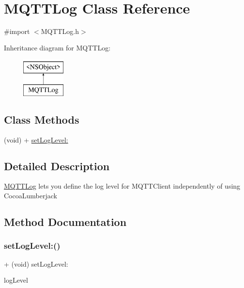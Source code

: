 \hypertarget{interface_m_q_t_t_log}{}\section{M\+Q\+T\+T\+Log Class Reference}
\label{interface_m_q_t_t_log}


{\ttfamily \#import $<$M\+Q\+T\+T\+Log.\+h$>$}

Inheritance diagram for M\+Q\+T\+T\+Log\+:\begin{figure}[H]
\begin{center}
\leavevmode
\includegraphics[height=2.000000cm]{interface_m_q_t_t_log}
\end{center}
\end{figure}
\subsection*{Class Methods}
\begin{DoxyCompactItemize}
\item 
(void) + \hyperlink{interface_m_q_t_t_log_a27f49af5a0c2f9b5d975bf3e9fef2c6c}{set\+Log\+Level\+:}
\end{DoxyCompactItemize}


\subsection{Detailed Description}
\hyperlink{interface_m_q_t_t_log}{M\+Q\+T\+T\+Log} lets you define the log level for M\+Q\+T\+T\+Client independently of using Cocoa\+Lumberjack 

\subsection{Method Documentation}
\mbox{\label{interface_m_q_t_t_log_a27f49af5a0c2f9b5d975bf3e9fef2c6c}} 
\subsubsection{\texorpdfstring{set\+Log\+Level\+:()}{setLogLevel:()}}
{\footnotesize\ttfamily + (void) set\+Log\+Level\+: \begin{DoxyParamCaption}\item[{(D\+D\+Log\+Level)}]{log\+Level }\end{DoxyParamCaption}}

